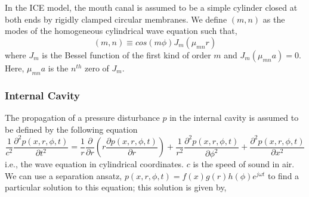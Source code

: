 \chapter{}

In the ICE model, the mouth canal is assumed to be a simple cylinder closed at 
both ends by rigidly clamped circular membranes. 
We define $(m,n)$ as the modes of the homogeneous cylindrical wave equation such that,
\begin{equation}\label{CylindricalHarmonic}
 (m,n)\equiv cos(m\phi)J_m\left(\mu_{mn}r\right)
\end{equation}
where $J_m$ is the Bessel function of the first kind of order $m$ and $J_m\left(\mu_{mn}a\right)=0$. 
Here, $\mu_{mn}a$ is the $n^{th}$ zero of $J_m$. 

\subsection{Internal Cavity}
The propagation of a pressure disturbance $p$ in the internal cavity is assumed to be defined by the following
equation
\begin{equation}\label{CavityCylindrical}
 \frac{1}{c^2}\frac{\partial^2p(x,r,\phi,t)}{\partial t^2}=\frac{1}{r}\frac{\partial}{\partial r}\left(r\frac{\partial p(x,r,\phi,t)}{\partial r}\right)+
 \frac{1}{r^2}\frac{\partial^2 p(x,r,\phi,t)}{\partial \phi^2}+\frac{\partial^2 p(x,r,\phi,t)}{\partial x^2}
\end{equation}
i.e., the wave equation in cylindrical coordinates. $c$ is the speed of sound in air. We can use a separation
ansatz, $p(x,r,\phi,t)=f(x)g(r)h(\phi)e^{j\omega t}$ to find a particular solution
to this equation; this solution is given by,

